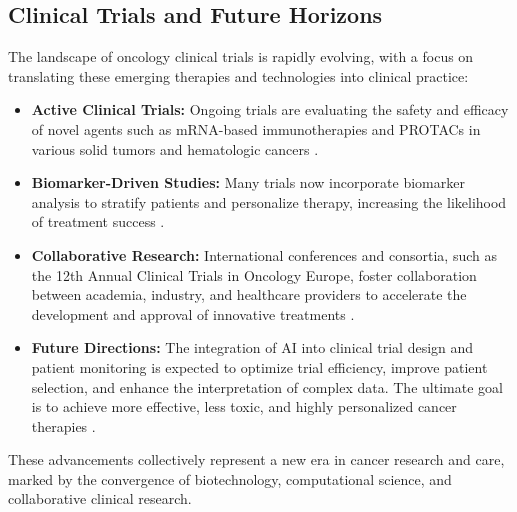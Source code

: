 \subsection{Clinical Trials and Future Horizons}

The landscape of oncology clinical trials is rapidly evolving, with a focus on translating these 
emerging therapies and technologies into clinical practice:

\begin{itemize}
    \item \textbf{Active Clinical Trials:} Ongoing trials are evaluating the safety and efficacy of 
    novel agents such as mRNA-based immunotherapies and PROTACs in various solid tumors and 
    hematologic cancers \cite{aiEarlyDetection2025, aiOncology2025}.
    
    \item \textbf{Biomarker-Driven Studies:} Many trials now incorporate biomarker analysis to 
    stratify patients and personalize therapy, increasing the likelihood of treatment success 
    \cite{therapeuticCancerVaccines2025}.
    
    \item \textbf{Collaborative Research:} International conferences and consortia, such as the 12th 
    Annual Clinical Trials in Oncology Europe, foster collaboration between academia, industry, and 
    healthcare providers to accelerate the development and approval of innovative treatments 
    \cite{geneEditingTherapy2025}.
    
    \item \textbf{Future Directions:} The integration of AI into clinical trial design and patient 
    monitoring is expected to optimize trial efficiency, improve patient selection, and enhance the 
    interpretation of complex data. The ultimate goal is to achieve more effective, less toxic, and 
    highly personalized cancer therapies \cite{clinicalTrialsEurope2025, nlmCitingMedicine2007}.
\end{itemize}

These advancements collectively represent a new era in cancer research and care, marked by the 
convergence of biotechnology, computational science, and collaborative clinical research.
